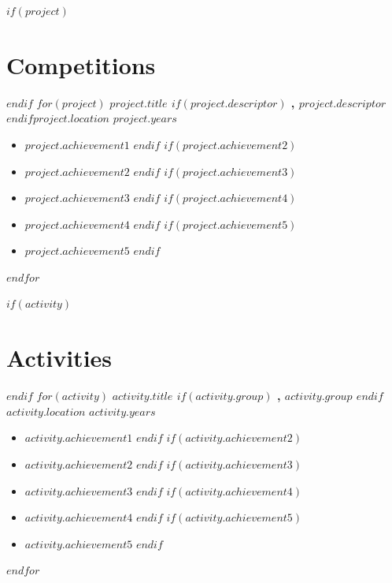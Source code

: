 \documentclass[11pt]{cv-class}
\begin{document}
$if(project)$ \section{Competitions} $endif$
$for(project)$
    \noindent\textbf{$project.title$ $if(project.descriptor)$ \unskip, \textit{$project.descriptor$} $endif$}\quad \textit{$project.location$} \hfill {$project.years$}
    \begin{itemize}[noitemsep,nolistsep,leftmargin=*]
        $if(project.achievement1)$ \item \raggedright{$project.achievement1$} $endif$
        $if(project.achievement2)$ \item \raggedright{$project.achievement2$} $endif$
        $if(project.achievement3)$ \item \raggedright{$project.achievement3$} $endif$
        $if(project.achievement4)$ \item \raggedright{$project.achievement4$} $endif$
        $if(project.achievement5)$ \item \raggedright{$project.achievement5$} $endif$
    \end{itemize}
    \bigskip
$endfor$

$if(activity)$ \section{Activities} $endif$
$for(activity)$
    \noindent\textbf{$activity.title$ $if(activity.group)$ \unskip, \textit{$activity.group$} $endif$}\quad \textit{$activity.location$} \hfill {$activity.years$}
    \begin{itemize}[noitemsep,nolistsep,leftmargin=*]
        $if(activity.achievement1)$ \item \raggedright{$activity.achievement1$} $endif$
        $if(activity.achievement2)$ \item \raggedright{$activity.achievement2$} $endif$
        $if(activity.achievement3)$ \item \raggedright{$activity.achievement3$} $endif$
        $if(activity.achievement4)$ \item \raggedright{$activity.achievement4$} $endif$
        $if(activity.achievement5)$ \item \raggedright{$activity.achievement5$} $endif$
    \end{itemize}
    \bigskip
$endfor$

\end{document}
